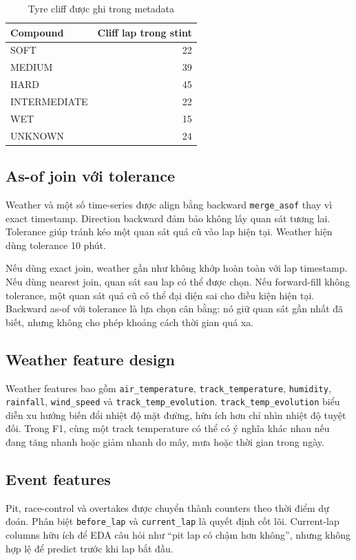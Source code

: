 \documentclass[conference]{IEEEtran}
\begin{document}
\begin{table}[htbp]
\caption{Tyre cliff được ghi trong metadata}
\label{tab:tyrecliff}
\centering
\begin{tabular}{lr}
\toprule
Compound & Cliff lap trong stint \\
\midrule
SOFT & 22 \\
MEDIUM & 39 \\
HARD & 45 \\
INTERMEDIATE & 22 \\
WET & 15 \\
UNKNOWN & 24 \\
\bottomrule
\end{tabular}
\end{table}

\subsection{As-of join với tolerance}
Weather và một số time-series được align bằng backward \texttt{merge\_asof} thay vì exact timestamp. Direction backward đảm bảo không lấy quan sát tương lai. Tolerance giúp tránh kéo một quan sát quá cũ vào lap hiện tại. Weather hiện dùng tolerance 10 phút.

Nếu dùng exact join, weather gần như không khớp hoàn toàn với lap timestamp. Nếu dùng nearest join, quan sát sau lap có thể được chọn. Nếu forward-fill không tolerance, một quan sát quá cũ có thể đại diện sai cho điều kiện hiện tại. Backward as-of với tolerance là lựa chọn cân bằng: nó giữ quan sát gần nhất đã biết, nhưng không cho phép khoảng cách thời gian quá xa.

\subsection{Weather feature design}
Weather features bao gồm \texttt{air\_temperature}, \texttt{track\_temperature}, \texttt{humidity}, \texttt{rainfall}, \texttt{wind\_speed} và \texttt{track\_temp\_evolution}. \texttt{track\_temp\_evolution} biểu diễn xu hướng biến đổi nhiệt độ mặt đường, hữu ích hơn chỉ nhìn nhiệt độ tuyệt đối. Trong F1, cùng một track temperature có thể có ý nghĩa khác nhau nếu đang tăng nhanh hoặc giảm nhanh do mây, mưa hoặc thời gian trong ngày.

\subsection{Event features}
Pit, race-control và overtakes được chuyển thành counters theo thời điểm dự đoán. Phân biệt \texttt{before\_lap} và \texttt{current\_lap} là quyết định cốt lõi. Current-lap columns hữu ích để EDA câu hỏi như ``pit lap có chậm hơn không'', nhưng không hợp lệ để predict trước khi lap bắt đầu.
\end{document}
